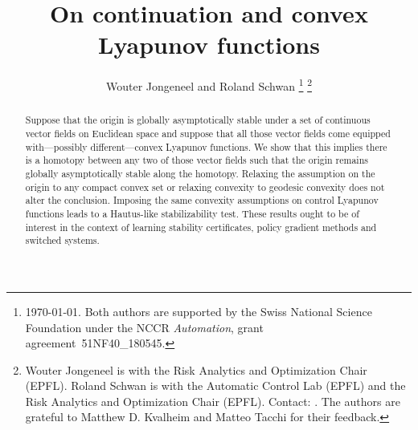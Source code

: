 \documentclass[letterpaper, 10 pt, conference]{ieeeconf}  %
\title{\textbf{On continuation and convex Lyapunov functions}}
\author{Wouter Jongeneel and Roland Schwan
\thanks{\today. Both authors are supported by the Swiss National Science Foundation under the NCCR \textit{Automation}, grant agreement~51NF40\_180545.}
\thanks{Wouter Jongeneel is with the Risk Analytics and Optimization Chair (EPFL). Roland Schwan is with the Automatic Control Lab (EPFL) and the Risk Analytics and Optimization Chair (EPFL). Contact: \text{\{wouter.jongeneel, roland.schwan\}}\text{@epfl.ch}. The authors are grateful to Matthew D. Kvalheim and Matteo Tacchi for their feedback.}}
\theoremstyle{mystyle}
\begin{document}
\maketitle
\thispagestyle{plain}
\pagestyle{plain}


\begin{abstract}
Suppose that the origin is globally asymptotically stable under a set of continuous vector fields on Euclidean space and suppose that all those vector fields come equipped with---possibly different---convex Lyapunov functions. We show that this implies there is a homotopy between any two of those vector fields such that the origin remains globally asymptotically stable along the homotopy. Relaxing the assumption on the origin to any compact convex set or relaxing convexity to geodesic convexity does not alter the conclusion. Imposing the same convexity assumptions on control Lyapunov functions leads to a Hautus-like stabilizability test. These results ought to be of interest in the context of learning stability certificates, policy gradient methods and switched systems.
\end{abstract}
\end{document}

